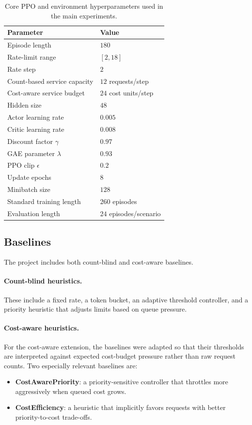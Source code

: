 \documentclass[conference]{IEEEtran}
\begin{document}
\begin{table}[H]
\centering
\caption{Core PPO and environment hyperparameters used in the main experiments.}
\label{tab:hyperparams}
\begin{tabular}{ll}
\toprule
Parameter & Value \\
\midrule
Episode length & $180$ \\
Rate-limit range & $[2,18]$ \\
Rate step & $2$ \\
Count-based service capacity & $12$ requests/step \\
Cost-aware service budget & $24$ cost units/step \\
Hidden size & $48$ \\
Actor learning rate & $0.005$ \\
Critic learning rate & $0.008$ \\
Discount factor $\gamma$ & $0.97$ \\
GAE parameter $\lambda$ & $0.93$ \\
PPO clip $\epsilon$ & $0.2$ \\
Update epochs & $8$ \\
Minibatch size & $128$ \\
Standard training length & $260$ episodes \\
Evaluation length & $24$ episodes/scenario \\
\bottomrule
\end{tabular}
\end{table}

\subsection{Baselines}
The project includes both count-blind and cost-aware baselines.

\paragraph{Count-blind heuristics.}
These include a fixed rate, a token bucket, an adaptive threshold controller, and a priority heuristic that adjusts limits based on queue pressure.

\paragraph{Cost-aware heuristics.}
For the cost-aware extension, the baselines were adapted so that their thresholds are interpreted against expected cost-budget pressure rather than raw request counts. Two especially relevant baselines are:
\begin{itemize}[leftmargin=1.5em]
    \item \textbf{CostAwarePriority}: a priority-sensitive controller that throttles more aggressively when queued cost grows.
    \item \textbf{CostEfficiency}: a heuristic that implicitly favors requests with better priority-to-cost trade-offs.
\end{itemize}
\end{document}
